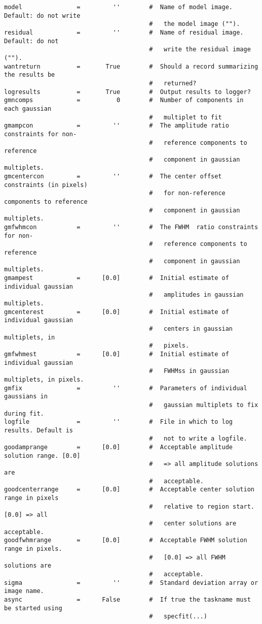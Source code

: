 \begin{verbatim}
model               =         ''        #  Name of model image. Default: do not write
                                        #   the model image ("").
residual            =         ''        #  Name of residual image. Default: do not
                                        #   write the residual image ("").
wantreturn          =       True        #  Should a record summarizing the results be
                                        #   returned?
logresults          =       True        #  Output results to logger?
gmncomps            =          0        #  Number of components in each gaussian
                                        #   multiplet to fit
gmampcon            =         ''        #  The amplitude ratio constraints for non-
                                        #   reference components to reference
                                        #   component in gaussian multiplets.
gmcentercon         =         ''        #  The center offset constraints (in pixels)
                                        #   for non-reference components to reference
                                        #   component in gaussian multiplets.
gmfwhmcon           =         ''        #  The FWHM  ratio constraints for non-
                                        #   reference components to reference
                                        #   component in gaussian multiplets.
gmampest            =      [0.0]        #  Initial estimate of individual gaussian
                                        #   amplitudes in gaussian multiplets.
gmcenterest         =      [0.0]        #  Initial estimate of individual gaussian
                                        #   centers in gaussian multiplets, in
                                        #   pixels.
gmfwhmest           =      [0.0]        #  Initial estimate of individual gaussian
                                        #   FWHMss in gaussian multiplets, in pixels.
gmfix               =         ''        #  Parameters of individual gaussians in
                                        #   gaussian multiplets to fix during fit.
logfile             =         ''        #  File in which to log results. Default is
                                        #   not to write a logfile.
goodamprange        =      [0.0]        #  Acceptable amplitude solution range. [0.0]
                                        #   => all amplitude solutions are
                                        #   acceptable.
goodcenterrange     =      [0.0]        #  Acceptable center solution range in pixels
                                        #   relative to region start. [0.0] => all
                                        #   center solutions are acceptable.
goodfwhmrange       =      [0.0]        #  Acceptable FWHM solution range in pixels.
                                        #   [0.0] => all FWHM solutions are
                                        #   acceptable.
sigma               =         ''        #  Standard deviation array or image name.
async               =      False        #  If true the taskname must be started using
                                        #   specfit(...)


\end{verbatim}
\normalsize

